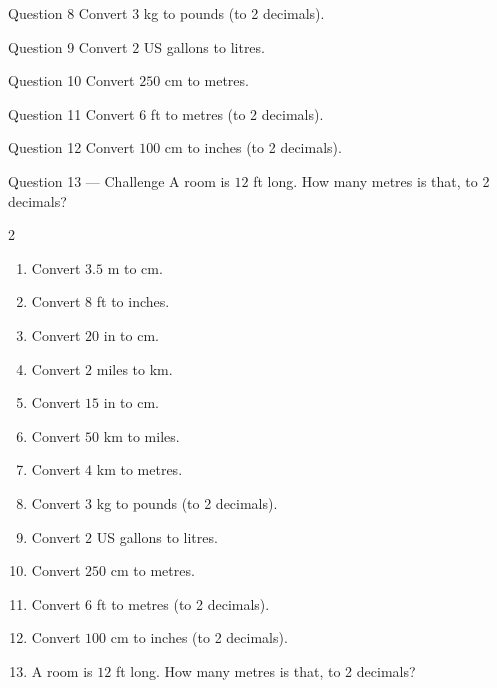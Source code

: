 \documentclass[11pt]{article}
\begin{document}
\begin{qbox}{Question 8}
Convert $3$ kg to pounds (to 2 decimals).\workspace{2.4cm}
\end{qbox}

\begin{qbox}{Question 9}
Convert $2$ US gallons to litres.\workspace{2.4cm}
\end{qbox}

\begin{qbox}{Question 10}
Convert $250$ cm to metres.\workspace{2.4cm}
\end{qbox}

\begin{qbox}{Question 11}
Convert $6$ ft to metres (to 2 decimals).\workspace{2.4cm}
\end{qbox}

\begin{qbox}{Question 12}
Convert $100$ cm to inches (to 2 decimals).\workspace{2.4cm}
\end{qbox}

\begin{qbox}{Question 13 --- Challenge}
A room is $12$ ft long. How many metres is that, to 2 decimals?\workspace{2.6cm}
\end{qbox}

\clearpage
{}

\begin{recapbox}
\begin{multicols}{2}
\small
\begin{enumerate}[leftmargin=*,itemsep=3pt]
  \item Convert $3.5$ m to cm.
  \item Convert $8$ ft to inches.
  \item Convert $20$ in to cm.
  \item Convert $2$ miles to km.
  \item Convert $15$ in to cm.
  \item Convert $50$ km to miles.
  \item Convert $4$ km to metres.
  \item Convert $3$ kg to pounds (to 2 decimals).
  \item Convert $2$ US gallons to litres.
  \item Convert $250$ cm to metres.
  \item Convert $6$ ft to metres (to 2 decimals).
  \item Convert $100$ cm to inches (to 2 decimals).
  \item A room is $12$ ft long. How many metres is that, to 2 decimals?
\end{enumerate}
\end{multicols}
\end{recapbox}
\end{document}
